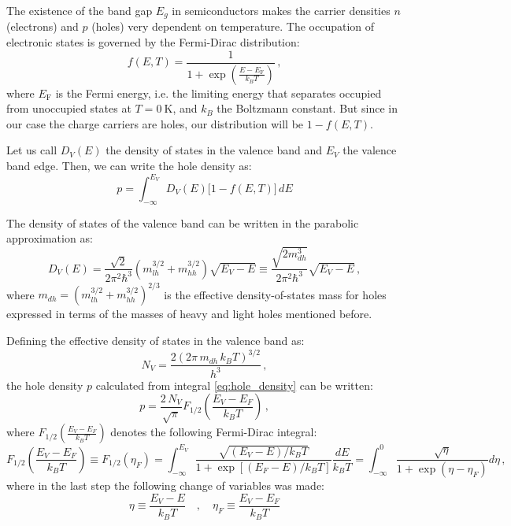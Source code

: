 \documentclass[11pt,a4paper]{article}
\begin{document}
The existence of the band gap $E_g$ in semiconductors makes the carrier densities $n$ (electrons) and $p$ (holes) very dependent on temperature. The occupation of electronic states is governed by the Fermi-Dirac distribution:
\begin{equation}\label{eq:Fermi-Dirac}
f(E,T)=\frac{1}{1+\exp\left(\frac{E-E_\text{F}}{k_BT}\right)}\,,
\end{equation}
where $E_\text{F}$ is the Fermi energy, i.e. the limiting energy that separates occupied from unoccupied states at $T=\SI{0}{\kelvin}$, and $k_B$ the Boltzmann constant. But since in our case the charge carriers are holes, our distribution will be $1-f(E,T)$.

Let us call $D_V(E)$ the density of states in the valence band and $E_V$ the valence band edge. Then, we can write the hole density as:
\begin{equation}\label{eq:hole_density}
p=\int_{-\infty}^{E_V}D_V(E)\big[1-f(E,T)\big]\,dE
\end{equation}

The density of states of the valence band can be written in the parabolic approximation as:
\begin{equation*}
D_V(E)=\frac{\sqrt{2}}{2\pi^2\hbar^3}\left(m_{lh}^{3/2}+m_{hh}^{3/2}\right)\sqrt{E_V-E}\equiv\frac{\sqrt{2m_{dh}^3}}{2\pi^2\hbar^3}\sqrt{E_V-E}\,,
\end{equation*}
where $m_{dh}=(m_{lh}^{3/2}+m_{hh}^{3/2})^{2/3}$ is the effective density-of-states mass for holes expressed in terms of the masses of heavy and light holes mentioned before.

Defining the effective density of states in the valence band as:
\begin{equation}\label{eq:Nv}
N_V=\frac{2\left(2\pi\,m_{dh}\,k_BT\right)^{3/2}}{h^3}\,,
\end{equation}
the hole density $p$ calculated from integral \eqref{eq:hole_density} can be written:
\begin{equation}\label{eq:p}
p=\frac{2\,N_V}{\sqrt{\pi}}F_{1/2}\!\left(\frac{E_V-E_F}{k_BT}\right)\,,
\end{equation}
where $F_{1/2}(\frac{E_V-E_F}{k_BT})$ denotes the following Fermi-Dirac integral:
\begin{equation*}
F_{1/2}\!\left(\frac{E_V-E_F}{k_BT}\right)\equiv F_{1/2}(\eta_F)=\int_{-\infty}^{E_V}\frac{\sqrt{(E_V-E)/k_BT}}{1+\exp\left[(E_F-E)/k_BT\right]}\frac{dE}{k_BT}=\int_{-\infty}^0\frac{\sqrt{\eta}}{1+\exp(\eta-\eta_F)}d\eta\,,
\end{equation*}
where in the last step the following change of variables was made:
\begin{equation*}
\eta\equiv\frac{E_V-E}{k_BT}\quad,\quad\eta_F\equiv\frac{E_V-E_F}{k_BT}
\end{equation*}
\end{document}
